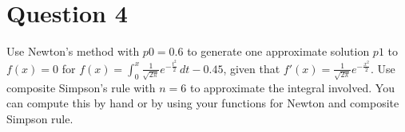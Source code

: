 \section{Question 4}

\begin{question}
    Use Newton’s method with $p0 = 0.6$ to generate one approximate solution $p1$ to $f(x) = 0$ for $f(x) = \int_{0}^{x}{\tfrac{1}{\sqrt{2\pi}}e^{-\frac{t^2}{2}}}\,dt - 0.45$, given that $f'(x) = \tfrac{1}{\sqrt{2\pi}}e^{-\frac{x^2}{2}}$. Use composite Simpson’s rule with $n = 6$ to approximate the integral involved. You can compute this by hand or by using your \MATLAB functions for Newton and composite Simpson rule.
\end{question}

\begin{answer}
    
\end{answer}